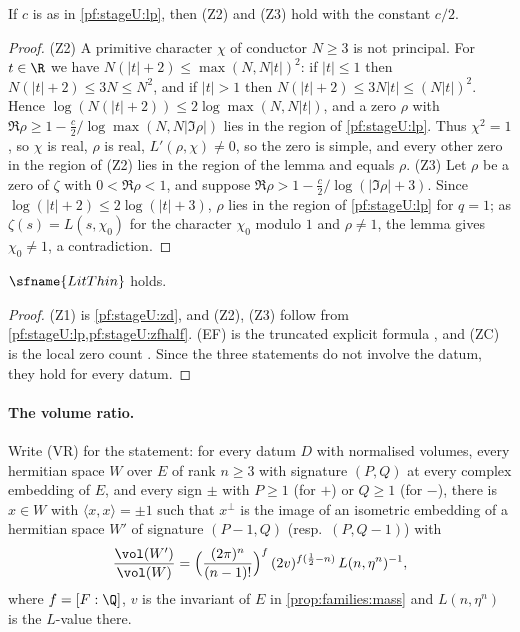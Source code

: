 \begin{lemma}\label{pf:stageU:zfhalf}
If $c$ is as in \cref{pf:stageU:lp}, then \textup{(Z2)} and \textup{(Z3)} hold with the constant $c/2$.
\end{lemma}

\begin{proof}
(Z2) A primitive character $\chi$ of conductor $N\ge3$ is not principal. For $t\in\R$ we have $N(|t|+2)\le\max(N,N|t|)^2$:
if $|t|\le1$ then $N(|t|+2)\le3N\le N^2$, and if $|t|>1$ then $N(|t|+2)\le3N|t|\le(N|t|)^2$. Hence
$\log(N(|t|+2))\le2\log\max(N,N|t|)$, and a zero $\rho$ with $\Re\rho\ge1-\frac c2/\log\max(N,N|\Im\rho|)$ lies in the region of
\cref{pf:stageU:lp}. Thus $\chi^2=1$, so $\chi$ is real, $\rho$ is real, $L'(\rho,\chi)\ne0$, so the zero is simple, and every
other zero in the region of (Z2) lies in the region of the lemma and equals $\rho$. (Z3) Let $\rho$ be a zero of $\zeta$ with
$0<\Re\rho<1$, and suppose $\Re\rho>1-\frac c2/\log(|\Im\rho|+3)$. Since $\log(|t|+2)\le2\log(|t|+3)$, $\rho$ lies in the region of
\cref{pf:stageU:lp} for $q=1$; as $\zeta(s)=L(s,\chi_0)$ for the character $\chi_0$ modulo $1$ and $\rho\ne1$, the lemma gives
$\chi_0\ne1$, a contradiction.
\end{proof}

\begin{theorem}\label{pf:stageU:litthin}
$\sfname{LitThin}$ holds.
\end{theorem}

\begin{proof}
(Z1) is \cref{pf:stageU:zd}, and (Z2), (Z3) follow from \cref{pf:stageU:lp,pf:stageU:zfhalf}. (EF) is the truncated explicit
formula  \cite[Ch.~17, 19]{Davenport2000}, and (ZC) is the local
zero count  \cite[Ch.~16]{Davenport2000}. Since the three statements do not
involve the datum, they hold for every datum.
\end{proof}

\paragraph{The volume ratio.}
Write (VR) for the statement: for every datum $D$ with normalised volumes, every hermitian space $W$ over $E$ of rank $n\ge3$
with signature $(P,Q)$ at every complex embedding of $E$, and every sign $\pm$ with $P\ge1$ (for $+$) or $Q\ge1$ (for $-$),
there is $x\in W$ with $\langle x,x\rangle=\pm1$ such that $x^\perp$ is the image of an isometric embedding of a hermitian
space $W'$ of signature $(P-1,Q)$ (resp.\ $(P,Q-1)$) with
\[
\frac{\vol(W')}{\vol(W)}=\Bigl(\frac{(2\pi)^n}{(n-1)!}\Bigr)^{f}\,(2v)^{f(\frac12-n)}\,L(n,\eta^n)^{-1},
\]
where $f=[F:\Q]$, $v$ is the invariant of $E$ in \cref{prop:families:mass} and $L(n,\eta^n)$ is the $L$-value there.

